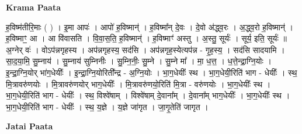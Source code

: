 \documentclass[17pt]{extarticle}
\begin{document}
\textbf{Krama Paata} \newline

ह॒विष्म॑तीरि॒माः ( ) । इ॒मा आपः॑ । आपो॑ ह॒विष्मान्॑ । ह॒विष्मा᳚न् दे॒वः । दे॒वो अ॑द्ध्व॒रः । अ॒द्ध्व॒रो ह॒विष्मान्॑ । ह॒विष्माꣳ॒॒ आ । आ वि॑वासति । वि॒वा॒स॒ति॒ ह॒विष्मान्॑ । ह॒विष्माꣳ॑ अस्तु । अ॒स्तु॒ सूर्यः॑ । सूर्य॒ इति॒ सूर्यः॑ ॥ अ॒ग्नेर् वः॑ । वोऽप॑न्नगृहस्य । अप॑न्नगृहस्य॒ सद॑सि । अप॑न्नगृह॒स्येत्यप॑न्न - गृ॒ह॒स्य॒ । सद॑सि सादयामि । सा॒द॒या॒मि॒ सु॒म्नाय॑ । सु॒म्नाय॑ सुम्निनीः । सु॒म्नि॒नीः॒ सु॒म्ने । सु॒म्ने मा᳚ । मा॒ ध॒त्त॒ । ध॒त्ते॒न्द्रा॒ग्नि॒योः । इ॒न्द्रा॒ग्नि॒योर् भा॑ग॒धेयीः᳚ । इ॒न्द्रा॒ग्नि॒योरिती᳚न्द्र - अ॒ग्नि॒योः । भा॒ग॒धेयीः᳚ स्थ । भा॒ग॒धेयी॒रिति॑ भाग - धेयीः᳚ । स्थ॒ मि॒त्रावरु॑णयोः । मि॒त्रावरु॑णयोर् भाग॒धेयीः᳚ । मि॒त्रावरु॑णयो॒रिति॑ मि॒त्रा - वरु॑णयोः । भा॒ग॒धेयीः᳚ स्थ । भा॒ग॒धेयी॒रिति॑ भाग - धेयीः᳚ । स्थ॒ विश्वे॑षाम् । विश्वे॑षाम् दे॒वाना᳚म् । दे॒वाना᳚म् भाग॒धेयीः᳚ । भा॒ग॒धेयीः᳚ स्थ । भा॒ग॒धेयी॒रिति॑ भाग - धेयीः᳚ । स्थ॒ य॒ज्ञे । य॒ज्ञे जा॑गृत । जा॒गृ॒तेति॑ जागृत । \newline

\textbf{Jatai Paata} \newline
\end{document}
